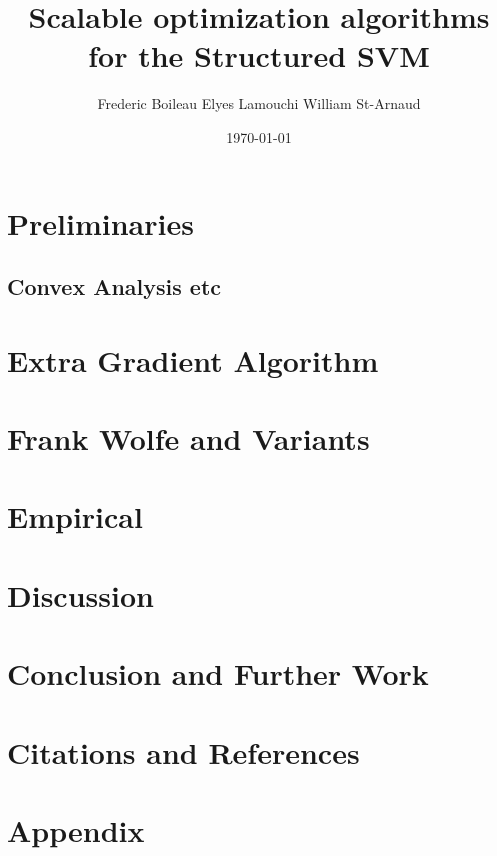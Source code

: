 

\usepackage[
  backend=biber,
  style=numeric,
  citestyle=numeric
  ]{biblatex}
\usepackage[mathcal]{eucal}

\title{Scalable optimization algorithms for the Structured SVM}
\date{\today}
\author{Frederic Boileau Elyes Lamouchi William St-Arnaud}

\maketitle

\clearpage

\clearpage
\section{Preliminaries}

\clearpage


\clearpage
\subsection{Convex Analysis etc}


\clearpage
\section{Extra Gradient Algorithm}


\clearpage
\section{Frank Wolfe and Variants}


\clearpage
\section{Empirical}


\clearpage
\section{Discussion}


\clearpage
\section{Conclusion and Further Work}


\clearpage
\section{Citations and References}
\printbibliography

\clearpage
\section{Appendix}


